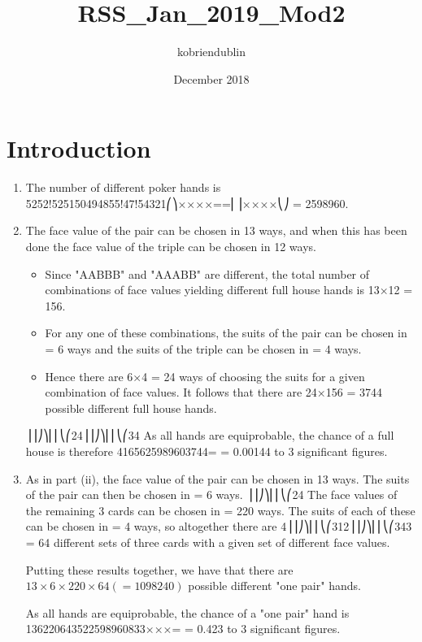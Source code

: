 \documentclass{article}
\title{RSS_Jan_2019_Mod2}
\author{kobriendublin }
\date{December 2018}
\begin{document}

\section{Introduction}

\begin{enumerate}
    \item The number of different poker hands is 5252!525150494855!47!54321⎛⎞××××==⎜⎟××××⎝⎠
= 2598960.
\item The face value of the pair can be chosen in 13 ways, and when this has been done the face value of the triple can be chosen in 12 ways. 
\begin{itemize}
\item Since "AABBB" and "AAABB" are different, the total number of combinations of face values yielding different full house hands is 13×12 = 156.

\item For any one of these combinations, the suits of the pair can be chosen in = 6 ways and the suits of the triple can be chosen in = 4 ways. 

\item Hence there are 6×4 = 24 ways of choosing the suits for a given combination of face values. It follows that there are 24×156 = 3744 possible different full house hands.
\end{itemize}

⎟⎟⎠⎞⎜⎜⎝⎛24⎟⎟⎠⎞⎜⎜⎝⎛34
As all hands are equiprobable, the chance of a full house is therefore 4165625989603744= = 0.00144 to 3 significant figures.
\item  As in part (ii), the face value of the pair can be chosen in 13 ways. The suits of the pair can then be chosen in = 6 ways. ⎟⎟⎠⎞⎜⎜⎝⎛24
The face values of the remaining 3 cards can be chosen in = 220 ways. The suits of each of these can be chosen in = 4 ways, so altogether there are 4⎟⎟⎠⎞⎜⎜⎝⎛312⎟⎟⎠⎞⎜⎜⎝⎛343 = 64 different sets of three cards with a given set of different face values.

Putting these results together, we have that there are $13×6×220×64 (= 1098240)$ possible different "one pair" hands. 

As all hands are equiprobable, the chance of a "one pair" hand is
136220643522598960833×××= = 0.423 to 3 significant figures.\end{enumerate}
\end{document}
